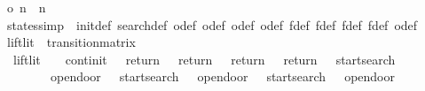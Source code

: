 \begin{isabellebody}
\isanewline
{}\isamarkupfalse%
\ {\isachardoublequoteopen}o\ n\ {\isacharequal}\ n\ {\isacharplus}\ {}{\isachardoublequoteclose}\isanewline
\isanewline
{}\isamarkupfalse%
\ states{\isacharbrackleft}simp{\isacharbrackright}\ {\isacharequal}\ init{\isacharunderscore}def\ search{\isacharunderscore}def\ o{}{\isacharunderscore}def\ o{}{\isacharunderscore}def\ o{}{\isacharunderscore}def\ o{}{\isacharunderscore}def\ f{}{\isacharunderscore}def\ f{}{\isacharunderscore}def\ f{}{\isacharunderscore}def\ f{}{\isacharunderscore}def\ o{\isacharunderscore}def\isanewline
\isanewline
{}\isamarkupfalse%
\ lift{\isacharunderscore}lit\ {\isacharcolon}{\isacharcolon}\ transition{\isacharunderscore}matrix\ \isanewline
\ \ {\isachardoublequoteopen}lift{\isacharunderscore}lit\ {\isacharequal}\ {\isacharbraceleft}{\isacharbar}{\isacharparenleft}{\isacharparenleft}{}{\isacharcomma}\ {}{\isacharparenright}{\isacharcomma}\ continit{\isacharparenright}{\isacharcomma}\ {\isacharparenleft}{\isacharparenleft}{}{\isacharcomma}\ {}{\isacharparenright}{\isacharcomma}\ return{}{\isacharparenright}{\isacharcomma}\ {\isacharparenleft}{\isacharparenleft}{}{\isacharcomma}\ {}{\isacharparenright}{\isacharcomma}\ return{}{\isacharparenright}{\isacharcomma}\ {\isacharparenleft}{\isacharparenleft}{}{\isacharcomma}\ {}{\isacharparenright}{\isacharcomma}\ return{}{\isacharparenright}{\isacharcomma}\ {\isacharparenleft}{\isacharparenleft}{}{\isacharcomma}\ {}{\isacharparenright}{\isacharcomma}\ return{}{\isacharparenright}{\isacharcomma}\ {\isacharparenleft}{\isacharparenleft}{}{\isacharcomma}\ {}{\isacharparenright}{\isacharcomma}\ startsearch{\isacharparenright}{\isacharcomma}\isanewline
\ \ \ \ \ \ {\isacharparenleft}{\isacharparenleft}{}{\isacharcomma}\ {}{\isacharparenright}{\isacharcomma}\ opendoor{}{\isacharparenright}{\isacharcomma}\ {\isacharparenleft}{\isacharparenleft}{}{\isacharcomma}\ {}{\isacharparenright}{\isacharcomma}\ startsearch{\isacharparenright}{\isacharcomma}\ {\isacharparenleft}{\isacharparenleft}{}{\isacharcomma}\ {}{\isacharparenright}{\isacharcomma}\ opendoor{}{\isacharparenright}{\isacharcomma}\ {\isacharparenleft}{\isacharparenleft}{}{\isacharcomma}\ {}{\isacharparenright}{\isacharcomma}\ startsearch{\isacharparenright}{\isacharcomma}\ {\isacharparenleft}{\isacharparenleft}{}{\isacharcomma}\ {}{\isacharparenright}{\isacharcomma}\ opendoor{}{\isacharparenright}{\isacharcomma}\isanewline

\end{isabellebody}
